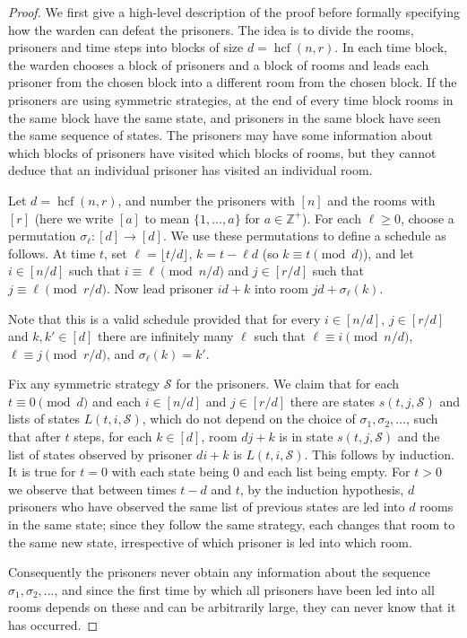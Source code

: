 \documentclass[a4paper,11pt]{extarticle}
\theoremstyle{definition}
\theoremstyle{remark}
\newcommand{\hcf}{\operatorname{hcf}}
\begin{document}
	\begin{proof}We first give a high-level description of the proof before formally specifying how the warden can defeat the prisoners. The idea is to divide the rooms, prisoners and time steps into blocks of size $d=\hcf(n,r)$. In each time block, the warden chooses a block of prisoners and a block of rooms and leads each prisoner from the chosen block into a different room from the chosen block. If the prisoners are using symmetric strategies, at the end of every time block rooms in the same block have the same state, and prisoners in the same block have seen the same sequence of states. The prisoners may have some information about which blocks of prisoners have visited which blocks of rooms, but they cannot deduce that an individual prisoner has visited an individual room.
		
		Let $d=\hcf(n,r)$, and number the prisoners with $[n]$ and the rooms with $[r]$ (here we write $[a]$ to mean $\{1,\ldots,a\}$ for $a\in \mathbb Z^+$). For each $\ell\geq 0$, choose a permutation $\sigma_\ell:[d]\to[d]$. We use these permutations to define a schedule as follows. At time $t$, set $\ell=\lfloor t/d \rfloor$, $k=t-\ell d$ (so $k\equiv t\pmod d$), and let $i\in [n/d]$ such that $i\equiv \ell\pmod{n/d}$ and $j\in [r/d]$ such that $j\equiv \ell\pmod{r/d}$. Now lead prisoner $id+k$ into room $jd+\sigma_{\ell}(k)$.
		
		Note that this is a valid schedule provided that for every $i\in[n/d]$, $j\in[r/d]$ and $k,k'\in[d]$ there are infinitely many $\ell$ such that $\ell\equiv i\pmod{n/d}$, $\ell\equiv j\pmod{r/d}$, and $\sigma_\ell(k)=k'$.
		
		Fix any symmetric strategy $\mathcal S$ for the prisoners. We claim that for each $t\equiv 0\pmod d$ and each $i\in [n/d]$ and $j\in[r/d]$ there are states $s(t,j,\mathcal S)$ and lists of states $L(t,i,\mathcal S)$, which do not depend on the choice of $\sigma_1,\sigma_2,\ldots$, such that after $t$ steps, for each $k\in [d]$, room $dj+k$ is in state $s(t,j,\mathcal S)$ and the list of states observed by prisoner $di+k$ is $L(t,i,\mathcal S)$. This follows by induction. It is true for $t=0$ with each state being $0$ and each list being empty. For $t>0$ we observe that between times $t-d$ and $t$, by the induction hypothesis, $d$ prisoners who have observed the same list of previous states are led into $d$ rooms in the same state; since they follow the same strategy, each changes that room to the same new state, irrespective of which prisoner is led into which room.
		
		Consequently the prisoners never obtain any information about the sequence $\sigma_1,\sigma_2,\ldots$, and since the first time by which all prisoners have been led into all rooms depends on these and can be arbitrarily large, they can never know that it has occurred.\end{proof}
	
\end{document}
